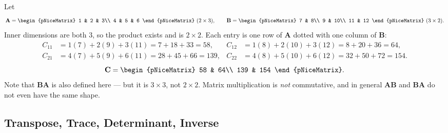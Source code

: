 \begin{workedexample}
Let
\[
  \mathbf{A} = \begin{pNiceMatrix} 1 & 2 & 3\\ 4 & 5 & 6 \end{pNiceMatrix}
  \ (2\times3),
  \qquad
  \mathbf{B} = \begin{pNiceMatrix} 7 & 8\\ 9 & 10\\ 11 & 12 \end{pNiceMatrix}
  \ (3\times2).
\]
Inner dimensions are both $3$, so the product exists and is $2\times2$. Each
entry is one row of $\mathbf{A}$ dotted with one column of $\mathbf{B}$:
\[
\begin{aligned}
  C_{11} &= 1(7) + 2(9) + 3(11) = 7+18+33 = 58, &
  C_{12} &= 1(8) + 2(10) + 3(12) = 8+20+36 = 64,\\
  C_{21} &= 4(7) + 5(9) + 6(11) = 28+45+66 = 139, &
  C_{22} &= 4(8) + 5(10) + 6(12) = 32+50+72 = 154.
\end{aligned}
\]
\[
  \mathbf{C} = \begin{pNiceMatrix} 58 & 64\\ 139 & 154 \end{pNiceMatrix}.
\]
Note that $\mathbf{B}\mathbf{A}$ is also defined here --- but it is
$3\times3$, not $2\times2$. Matrix multiplication is \emph{not} commutative,
and in general $\mathbf{A}\mathbf{B}$ and $\mathbf{B}\mathbf{A}$ do not even
have the same shape.
\end{workedexample}

\subsection{Transpose, Trace, Determinant, Inverse}

